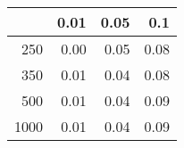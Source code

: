 % 
\begin{tabular}{rrrr}
  \hline
 & 0.01 & 0.05 & 0.1 \\ 
  \hline
250 & 0.00 & 0.05 & 0.08 \\ 
  350 & 0.01 & 0.04 & 0.08 \\ 
  500 & 0.01 & 0.04 & 0.09 \\ 
  1000 & 0.01 & 0.04 & 0.09 \\ 
   \hline
\end{tabular}
